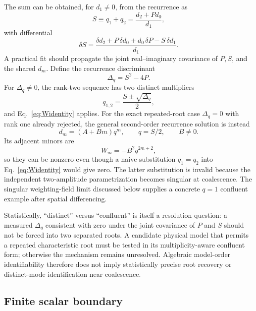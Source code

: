 \documentclass[11pt]{article}
\begin{document}
The sum can be obtained, for $d_1\neq0$, from the recurrence as
\begin{equation}
S\equiv q_1+q_2=\frac{d_2+P d_0}{d_1},
\end{equation}
with differential
\begin{equation}
\boxed{\delta S=\frac{\delta d_2+P\,\delta d_0+d_0\,\delta P-S\,\delta d_1}{d_1}.}
\label{eq:rank2_sum_delta}
\end{equation}
A practical fit should propagate the joint real--imaginary covariance of $P,S$, and the shared $d_m$.  Define the recurrence discriminant
\begin{equation}
\boxed{\Delta_q=S^2-4P.}
\label{eq:rank2_discriminant}
\end{equation}
For $\Delta_q\neq0$, the rank-two sequence has two distinct multipliers
\begin{equation}
q_{1,2}=\frac{S\pm\sqrt{\Delta_q}}{2},
\end{equation}
and Eq.~\eqref{eq:Widentity} applies. For the exact repeated-root case $\Delta_q=0$ with rank one already rejected, the general second-order recurrence solution is instead
\begin{equation}
\boxed{d_m=(A+Bm)q^m,\qquad q=S/2,\qquad B\neq0.}
\label{eq:confluent_rank2}
\end{equation}
Its adjacent minors are
\begin{equation}
\boxed{W_m=-B^2q^{2m+2},}
\label{eq:confluent_minors}
\end{equation}
so they can be nonzero even though a naive substitution $q_1=q_2$ into Eq.~\eqref{eq:Widentity} would give zero. The latter substitution is invalid because the independent two-amplitude parametrization becomes singular at coalescence. The singular weighting-field limit discussed below supplies a concrete $q=1$ confluent example after spatial differencing.

Statistically, ``distinct'' versus ``confluent'' is itself a resolution question: a measured $\Delta_q$ consistent with zero under the joint covariance of $P$ and $S$ should not be forced into two separated roots. A candidate physical model that permits a repeated characteristic root must be tested in its multiplicity-aware confluent form; otherwise the mechanism remains unresolved. Algebraic model-order identifiability therefore does not imply statistically precise root recovery or distinct-mode identification near coalescence.

\subsection{Finite scalar boundary}
\end{document}
